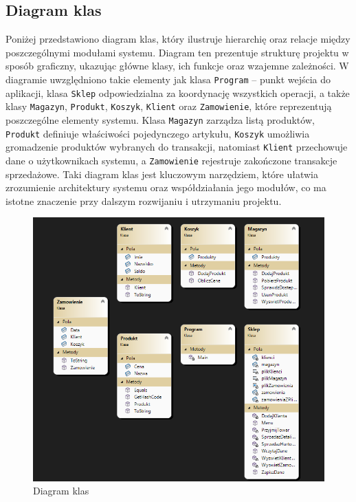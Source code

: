 \subsection{Diagram klas}
Poniżej przedstawiono diagram klas, który ilustruje hierarchię oraz relacje między poszczególnymi modułami systemu. Diagram ten prezentuje strukturę projektu w sposób graficzny, ukazując główne klasy, ich funkcje oraz wzajemne zależności. W diagramie uwzględniono takie elementy jak klasa \texttt{Program} – punkt wejścia do aplikacji, klasa \texttt{Sklep} odpowiedzialna za koordynację wszystkich operacji, a także klasy \texttt{Magazyn}, \texttt{Produkt}, \texttt{Koszyk}, \texttt{Klient} oraz \texttt{Zamowienie}, które reprezentują poszczególne elementy systemu. Klasa \texttt{Magazyn} zarządza listą produktów, \texttt{Produkt} definiuje właściwości pojedynczego artykułu, \texttt{Koszyk} umożliwia gromadzenie produktów wybranych do transakcji, natomiast \texttt{Klient} przechowuje dane o użytkownikach systemu, a \texttt{Zamowienie} rejestruje zakończone transakcje sprzedażowe. Taki diagram klas jest kluczowym narzędziem, które ułatwia zrozumienie architektury systemu oraz współdziałania jego modułów, co ma istotne znaczenie przy dalszym rozwijaniu i utrzymaniu projektu.

\begin{figure}[ht]
    \centering
    \includegraphics[width=0.9\linewidth]{figures/Hierarchia_klas.png}
    \caption{Diagram klas}
\end{figure}

